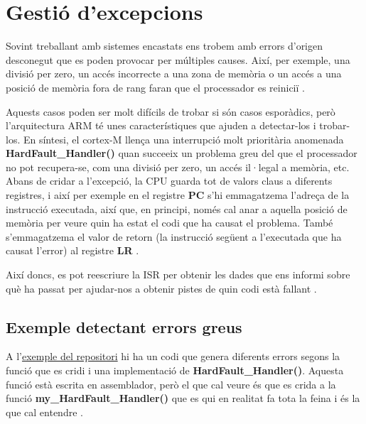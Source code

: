 
\chapter{Gestió d'excepcions}
\label{ch:exceptions}
Sovint treballant amb sistemes encastats ens trobem amb errors d'origen desconegut que es poden provocar per múltiples causes. Així, per exemple, una divisió per zero, un accés incorrecte a una zona de memòria o un accés a una posició de memòria fora de rang faran que el processador es reiniciï \cite[102]{DesignersGuide}\cite[318]{ARMsdg}\cite{KielHardFault}.

Aquests casos poden ser molt difícils de trobar si són casos esporàdics, però l'arquitectura ARM té unes característiques que ajuden a detectar-los i trobar-los. En síntesi, el cortex-M llença una interrupció molt prioritària anomenada {\bf HardFault\_Handler()} quan succeeix un problema greu del que el processador no pot recupera-se, com una divisió per zero, un accés il·legal a memòria, etc. Abans de cridar a l'excepció, la CPU guarda tot de valors claus a diferents registres, i així per exemple en el registre {\bf PC} s'hi emmagatzema l'adreça de la instrucció executada, així que, en principi, només cal anar a aquella posició de memòria per veure quin ha estat el codi que ha causat el problema. També s'emmagatzema el valor de retorn (la  instrucció següent a l'executada que ha causat l'error) al registre {\bf LR} \cite{BlogHardFalut}.

Així doncs, es pot reescriure la ISR per obtenir les dades que ens informi sobre què ha passat per ajudar-nos a obtenir pistes de quin codi està fallant \cite{ARMHandler}.

\section{Exemple detectant errors greus}
A l'\href{https://github.com/mariusmm/cursembedded/tree/master/Simplicity/ErrorHandling}{exemple del repositori} hi ha un codi que genera diferents errors segons la funció que es cridi i una implementació de {\bf HardFault\_Handler()}. Aquesta funció està escrita en assemblador, però el que cal veure és que es crida a la funció {\bf my\_HardFault\_Handler()} que es qui en realitat fa tota la feina i és la que cal entendre \cite{EFM32HardFault}.

